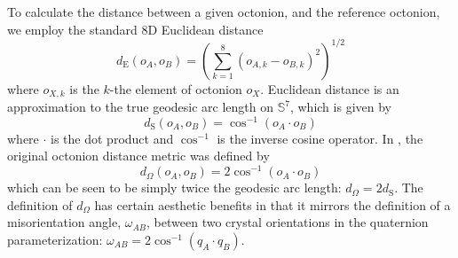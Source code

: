 \documentclass[final,twocolumn,12pt]{elsarticle}
\begin{document}
To calculate the distance between a given octonion, and the reference octonion, we employ the standard 8D Euclidean distance
\begin{equation}
    \label{eq:8Deuclidean_dist}
    d_{\text{E}}\!\left(o_{A},o_{B}\right) = {\left(\sum_{k=1}^{8} {\left(o_{A,k} - o_{B,k}\right)}^2 \right)}^{1/2}
\end{equation}
where $o_{X,k}$ is the $k$-the element of octonion $o_X$. Euclidean distance is an approximation to the true geodesic arc length on $\mathbb{S}^7$, which is given by
\begin{equation}
    \label{eq:7sphere_arc_length}
    d_{\text{S}}\!\left(o_{A},o_{B}\right)=\cos ^{-1}\left(o_A\cdot o_B\right)
\end{equation}
where $\cdot$ is the dot product and $\cos ^{-1}$ is the inverse cosine operator. In \cite{francisGeodesicOctonionMetric2019}, the original octonion distance metric was defined by
\begin{equation}
    \label{eq:7sphere_arc_length}
    d_\Omega\!\left(o_{A},o_{B}\right) = 2\cos ^{-1}\left(o_A\cdot o_B\right)
\end{equation}
which can be seen to be simply twice the geodesic arc length: $d_\Omega = 2 d_{\text{S}}$. The definition of $d_\Omega$ has certain aesthetic benefits in that it mirrors the definition of a misorientation angle, $\omega_{AB}$, between two crystal orientations in the quaternion parameterization: $\omega_{AB} = 2 \cos^{-1}{\left(q_A \cdot q_B\right)}$.
\end{document}
